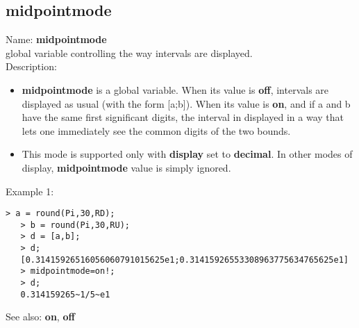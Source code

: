 \subsection{ midpointmode }
\noindent Name: \textbf{midpointmode}\\
global variable controlling the way intervals are displayed.\\

\noindent Description: \begin{itemize}

\item \textbf{midpointmode} is a global variable. When its value is \textbf{off}, intervals are displayed
   as usual (with the form [a;b]).
   When its value is \textbf{on}, and if a and b have the same first significant digits,
   the interval in displayed in a way that lets one immediately see the common
   digits of the two bounds.

\item This mode is supported only with \textbf{display} set to \textbf{decimal}. In other modes of 
   display, \textbf{midpointmode} value is simply ignored.
\end{itemize}
\noindent Example 1: 
\begin{center}\begin{minipage}{14.8cm}\begin{Verbatim}[frame=single]
   > a = round(Pi,30,RD);
   > b = round(Pi,30,RU);
   > d = [a,b];
   > d;
   [0.31415926516056060791015625e1;0.31415926553308963775634765625e1]
   > midpointmode=on!;
   > d;
   0.314159265~1/5~e1
\end{Verbatim}
\end{minipage}\end{center}
See also: \textbf{on}, \textbf{off}

